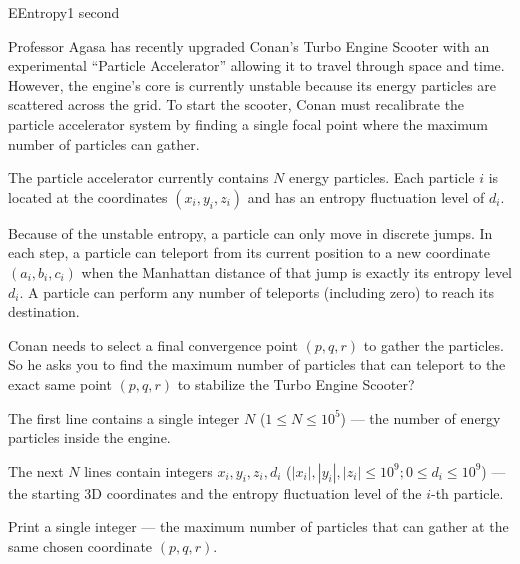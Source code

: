 \begin{problem}{E}{Entropy}{1 second}

\noindent
Professor Agasa has recently upgraded Conan's Turbo Engine Scooter with an experimental ``Particle Accelerator'' allowing it to travel through space and time. However, the engine's core is currently unstable because its energy particles are scattered across the grid. To start the scooter, Conan must recalibrate the particle accelerator system by finding a single focal point where the maximum number of particles can gather.

\noindent
The particle accelerator currently contains $N$ energy particles. Each particle $i$ is located at the coordinates $(x_i, y_i, z_i)$ and has an entropy fluctuation level of $d_i$.

\noindent
Because of the unstable entropy, a particle can only move in discrete jumps. In each step, a particle can teleport from its current position to a new coordinate $(a_i, b_i, c_i)$ when the Manhattan distance of that jump is exactly its entropy level $d_i$. A particle can perform any number of teleports (including zero) to reach its destination.

\noindent
Conan needs to select a final convergence point $(p, q, r)$ to gather the particles. So he asks you to find the maximum number of particles that can teleport to the exact same point $(p, q, r)$ to stabilize the Turbo Engine Scooter?

\InputFile

\noindent
The first line contains a single integer $N$ ($1 \le N \le 10^5$) --- the number of energy particles inside the engine.

\noindent
The next $N$ lines contain integers $x_i,y_i,z_i,d_i$ ($|x_i|,|y_i|,|z_i| \le 10^9;0\le d_i \le 10^9$) --- the starting 3D coordinates and the entropy fluctuation level of the $i$-th particle.

\OutputFile

\noindent
Print a single integer --- the maximum number of particles that can gather at the same chosen coordinate $(p, q, r)$.

\Examples

\begin{example}
\end{example}

\pagebreak

\end{problem}